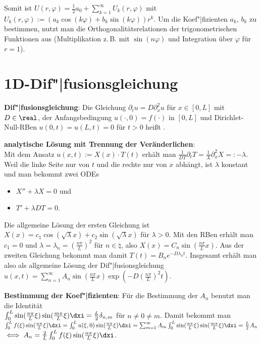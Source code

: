 Somit ist $U(r, \varphi) = \frac{1}{2} a_0 + \sum_{k=1}^\infty U_k(r, \varphi)$ mit
$U_k(r, \varphi) := (a_k \cos(k \varphi) + b_k \sin(k \varphi)) r^k$.
Um die Koef"|fizienten $a_k$, $b_k$ zu bestimmen, nutzt man die Orthogonalitätsrelationen
der trigonometrischen Funktionen aus
(Multiplikation z.\,B. mit $\sin(n\varphi)$ und Integration über $\varphi$ für $r = 1$).

\section{%
    1D-Dif"|fusionsgleichung%
}

\textbf{Dif"|fusionsgleichung}:
Die Gleichung $\partial_t u = D \partial_x^2 u$ für $x \in [0, L]$ mit $D \in \real$,
der Anfangsbedingung $u(\cdot, 0) = f(\cdot)$ in $[0, L]$ und
Dirichlet-Null-RBen $u(0, t) = u(L, t) = 0$ für $t > 0$ heißt .

\textbf{analytische Lösung mit Trennung der Veränderlichen}:\\
Mit dem Ansatz $u(x, t) := X(x) \cdot T(t)$ erhält man
$\frac{1}{DT} \partial_t T = \frac{1}{X} \partial_x^2 X =: -\lambda$.
Weil die linke Seite nur von $t$ und die rechte nur von $x$ abhängt, ist $\lambda$ konstant und
man bekommt zwei ODEs
\begin{itemize}
    \item
    $X'' + \lambda X = 0$ und

    \item
    $T' + \lambda DT = 0$.
\end{itemize}
Die allgemeine Lösung der ersten Gleichung ist
$X(x) = c_1 \cos(\sqrt{\lambda} x) + c_2 \sin(\sqrt{\lambda} x)$ für $\lambda > 0$.
Mit den RBen erhält man $c_1 = 0$ und $\lambda = \lambda_n = (\frac{n \pi}{L})^2$ für
$n \in \natural$, also $X(x) = C_n \sin(\frac{n \pi}{L} x)$.
Aus der zweiten Gleichung bekommt man damit $T(t) = B_n e^{-D \lambda_n t}$.
Insgesamt erhält man also als allgemeine Lösung der Dif"|fusionsgleichung
$u(x, t) = \sum_{n=1}^\infty A_n \sin(\frac{n \pi}{L} x) \exp(-D (\frac{n \pi}{L})^2 t)$.

\textbf{Bestimmung der Koef"|fizienten}:
Für die Bestimmung der $A_n$ benutzt man die Identität\\
$\int_0^L \sin(\frac{n \pi}{L} \xi) \sin(\frac{m \pi}{L} \xi) \dxi = \frac{L}{2} \delta_{n,m}$
für $n \not= 0 \not= m$.
Damit bekommt man\\
$\int_0^L f(\xi) \sin(\frac{n \pi}{L} \xi) \dxi
= \int_0^L u(\xi, 0) \sin(\frac{n \pi}{L} \xi) \dxi
= \sum_{m=1}^\infty A_m \int_0^L \sin(\frac{n \pi}{L} \xi) \sin(\frac{m \pi}{L} \xi) \dxi
= \frac{L}{2} A_n$\\
$\iff A_n = \frac{2}{L} \int_0^L f(\xi) \sin(\frac{n \pi}{L} \xi) \dxi$.

